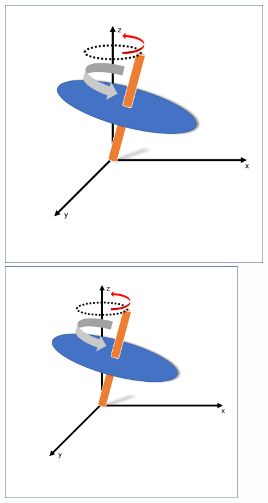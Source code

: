 \documentclass[10pt]{beamer}
\begin{document}
\begin{frame}
\begin{figure}
	\begin{minipage}{0.49\textwidth}
		\centering
		\includegraphics[width=1.0\textwidth]{sphere1.png}
	\end{minipage}
	\begin{minipage}{0.49\textwidth}
		\centering
		\includegraphics[width=0.9\textwidth]{sphere1.png}
	\end{minipage}


\end{figure}
\end{frame}
\end{document}
